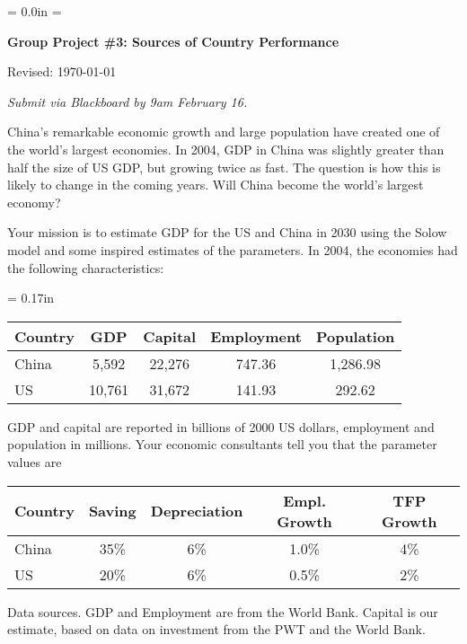 \documentclass[letterpaper,12pt]{exam}
\def\HeadName{Group Project \#3}
\begin{document}
\parindent = 0.0in
\parskip = \bigskipamount
\thispagestyle{empty}%
\Head

\centerline{\large \bf \HeadName:  Sources of Country Performance}%
\centerline{Revised:  \today}

\medskip
{\it Submit via Blackboard by 9am February 16.}

\begin{questions}
China's remarkable economic growth and large
population have created one of the world's largest economies. In
2004, GDP in China was slightly greater than half the size of US
GDP, but growing twice as fast. The question is how this is likely
to change in the coming years. 
Will China become the world's largest economy?  

Your mission is to estimate GDP for the US and China in 2030 
using the Solow model and some inspired estimates of
the parameters. In 2004, the economies had the following
characteristics:
%
\begin{center}
\tabcolsep = 0.17in
\begin{tabular}{lcccc}
\hline\hline
Country   &  GDP &  Capital &  Employment &  Population \\
\hline\hline
China   &  5,592 &  22,276   & 747.36  & 1,286.98\phantom{1,} \\%
US      & 10,761 &  31,672   & 141.93  &  292.62 \\%
\hline\hline
\end{tabular}
\end{center}
%
GDP and capital are reported in billions of 2000 US dollars,
employment and population in millions.  Your economic consultants
tell you that the parameter values are
%
\begin{center}
\begin{tabular}{lcccc}
\hline\hline
Country \hspace{0.1in}  &  Saving &  Depreciation &  Empl. Growth &  TFP Growth    \\
\hline\hline
China   &  35\% &  6\%   &   1.0\%  & 4\%  \\%
US      &  20\% &  6\%   &   0.5\%  & 2\%  \\%
\hline\hline
\end{tabular}
\end{center}
%
Data sources. GDP and Employment are from the World Bank. Capital is
our estimate, based on data on investment from the PWT and the World
Bank.
%
\begin{parts}

\end{parts}
\end{questions}
\end{document}

